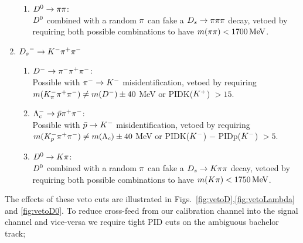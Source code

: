 \begin{enumerate}
\begin{enumerate}
	\item ${{D}^0}\rightarrow{\ensuremath{\pi}}{\ensuremath{\pi}}$: \\
	${{D}^0}$ combined with a random ${\pi}$ can fake a ${{D}_{s}}\rightarrow{\ensuremath{\pi}}{\ensuremath{\pi}}{\ensuremath{\pi}}$ decay, 
		vetoed by requiring both possible combinations to have $m({\pi}{\pi}) < 1700 \mathrm{\,Me\kern -0.1em V}$.

\end{enumerate}

\item ${{D}_{s}}^- \rightarrow K^- {\pi}^+{\pi}^-$

\begin{enumerate}


	\item ${{D}^-} \rightarrow{\ensuremath{{\pi}^-}}{\ensuremath{{\pi}^+}}{\ensuremath{{\pi}^-}}$:  \\
	Possible with ${{\pi}^-}\rightarrow{\ensuremath{{K}^-}}$ misidentification, vetoed by requiring 
	$m(K^-_\pi {\ensuremath{{\pi}^+}} {\ensuremath{{\pi}^-}}) \ne m(D^-) \pm 40$ MeV 
	or PIDK(${{K}^+}$) $> 15$.
	
	
	\item $\Lambda_c^- \rightarrow \bar p {{\pi}^+} {{\pi}^-} $: \\
	Possible with $\bar p \rightarrow {\ensuremath{{K}^-}}$ misidentification, vetoed by requiring
	$m(K^-_p {{\pi}^+} {{\pi}^-}) \ne m(\Lambda_c) \pm 40$ MeV
	or PIDK(${{K}^-}$) $-$ PIDp(${{K}^-}$) $> 5$.
	
	\item ${{D}^0}\rightarrow{\ensuremath{K}}{\ensuremath{\pi}}$: \\
	${{D}^0}$ combined with a random ${\pi}$ can fake a ${{D}_{s}}\rightarrow{\ensuremath{K}}{\ensuremath{\pi}}{\ensuremath{\pi}}$ decay, 
		vetoed by requiring both possible combinations to have $m({K}{\pi}) < 1750 \mathrm{\,Me\kern -0.1em V}$.
\end{enumerate}

\end{enumerate}
The effects of these veto cuts are illustrated in Figs.~\ref{fig:vetoD},\ref{fig:vetoLambda} and \ref{fig:vetoD0}.
To reduce cross-feed from our calibration channel into the signal channel and vice-versa we require tight PID cuts on the ambiguous bachelor track; 
